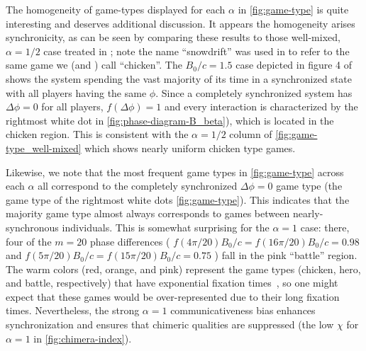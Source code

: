 \documentclass[pdflatex,lineno,referee,sn-mathphys-ay]{sn-jnl}
\begin{document}
The homogeneity of game-types displayed for each $\alpha$ in \cref{fig:game-type}
is quite interesting and deserves additional discussion.
It appears the homogeneity arises  synchronicity,
as can be seen by comparing these results
to those well-mixed, $\alpha = 1/2$ case treated in \citet{tripp2022evolutionary};
note the name ``snowdrift'' was used in \citet{tripp2022evolutionary}
to refer to the same game we (and \citet{bruns2015names}) call ``chicken''.
The $B_0/c = 1.5$ case depicted in figure 4 of \citet{tripp2022evolutionary}
shows the system spending the vast majority of its time in a synchronized state
with all players having the same $\phi$.
Since a completely synchronized system has $\Delta \phi = 0$ for all players,
$f(\Delta \phi) = 1$ and every interaction is characterized
by the rightmost white dot in \cref{fig:phase-diagram-B_beta}),
which is located in the chicken region.
This is consistent with the $\alpha = 1/2$ column
of \cref{fig:game-type_well-mixed} which shows nearly uniform chicken type games.

Likewise, we note that the most frequent game types
in \cref{fig:game-type} across each $\alpha$ all correspond
to the completely synchronized $\Delta \phi = 0$ game type
(\ie the game type of the rightmost white dots \cref{fig:game-type}).
This indicates that the majority game type almost always
corresponds to games between nearly-synchronous individuals.
This is somewhat surprising for the $\alpha = 1$ case:
there, four of the $m = 20$ phase differences
(
$f(4\pi/20) B_0/c = f(16\pi/20) B_0/c = \num{0.98}$
and
$f(5\pi/20) B_0/c = f(15\pi/20) B_0/c = \num{0.75}$
)
fall in the pink ``battle'' region.
The warm colors (red, orange, and pink)
represent the game types (chicken, hero, and battle, respectively)
that have exponential fixation times~\citep{antal2006fixation},
so one might expect that these games would be over-represented
due to their long fixation times.
Nevertheless, the strong $\alpha = 1$ communicativeness bias
enhances synchronization and ensures that
chimeric qualities are suppressed
(\cf the low $\chi$ for $\alpha = 1$ in \cref{fig:chimera-index}).
\end{document}
